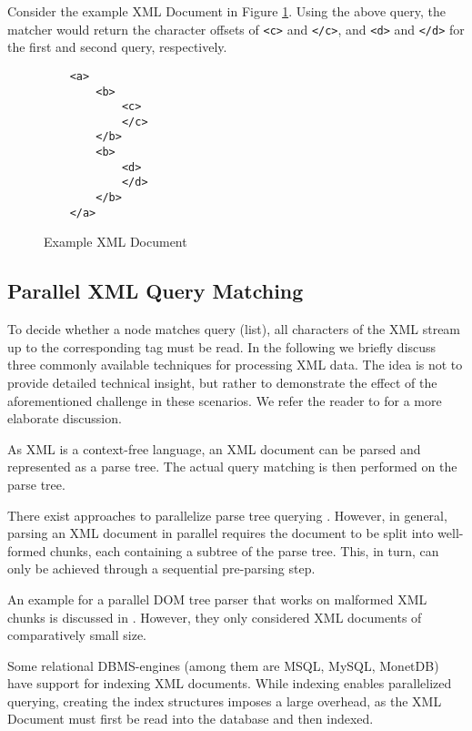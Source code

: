 Consider the example XML Document in Figure \ref{src:exampleXML}. Using the
above query, the matcher would return the character offsets of \verb;<c>; and
\verb;</c>;, and \verb;<d>; and \verb;</d>; for the first and second query,
respectively.

\lstset{
         numbers=left
 }

\begin{figure}[htb]
\begin{lstlisting}
    <a>
        <b>
            <c>
            </c>
        </b>
        <b>
            <d>
            </d>
        </b>
    </a>
\end{lstlisting}
\caption{Example XML Document}
\label{src:exampleXML}
\end{figure}


\subsection{Parallel XML Query Matching}
To decide whether a node matches query (list), all characters of the XML stream
up to the corresponding tag must be read. In the following we briefly discuss
three commonly available techniques for processing XML data. The idea is not to
provide detailed technical insight, but rather to demonstrate the effect of the
aforementioned challenge in these scenarios. We refer the reader to
\cite{Ogden2013} for a more elaborate discussion.

 As XML is a context-free language, an XML
document can be parsed and represented as a parse tree. The actual query
matching is then performed on the parse tree.

There exist approaches to parallelize parse tree querying \cite{You11}. However,
in general, parsing an XML document in parallel requires the document to be
split into well-formed chunks, each containing a subtree of the parse tree.
This, in turn, can only be achieved through a sequential pre-parsing step.

An example for a parallel DOM tree parser that works on malformed XML chunks is
discussed in \cite{Shah09}. However, they only considered XML documents of
comparatively small size.

 Some relational DBMS-engines (among them are MSQL,
MySQL, MonetDB) have support for indexing XML documents. While indexing enables
parallelized querying, creating the index structures imposes a large overhead,
as the XML Document must first be read into the database and then indexed.

